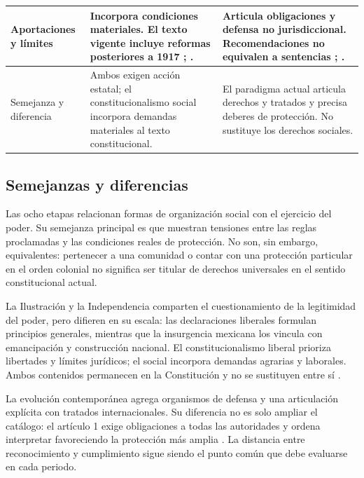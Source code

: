 \documentclass[12pt,spanish,letterpaper,oneside]{article}
\newlength{\categorywidth}
\newlength{\periodwidth}
\newlength{\lastperiodwidth}
\begin{document}
\begin{landscape}
\begin{longtable}{|>{\raggedright\arraybackslash}p{\categorywidth}|>{\raggedright\arraybackslash}p{\periodwidth}|>{\raggedright\arraybackslash}p{\lastperiodwidth}|}
Aportaciones y l\'imites & Incorpora condiciones materiales. El texto vigente incluye reformas posteriores a 1917 \citep[p.~2]{arteaga}; \citep[arts.~3, 27 y 123]{cpeum2026}. & Articula obligaciones y defensa no jurisdiccional. Recomendaciones no equivalen a sentencias \citep[pp.~47--48]{alvarez2009}; \citep[arts.~1 y 102 B]{cpeum2026}. \\\hline
Semejanza y diferencia & Ambos exigen acci\'on estatal; el constitucionalismo social incorpora demandas materiales al texto constitucional. & El paradigma actual articula derechos y tratados y precisa deberes de protecci\'on. No sustituye los derechos sociales. \\\hline
\end{longtable}
\end{landscape}
\clearpage
\pagestyle{plain}
\onehalfspacing

\subsection{Semejanzas y diferencias}
Las ocho etapas relacionan formas de organizaci\'on social con el ejercicio
del poder. Su semejanza principal es que muestran tensiones entre las
reglas proclamadas y las condiciones reales de protecci\'on. No son,
sin embargo, equivalentes: pertenecer a una comunidad o contar con una
protecci\'on particular en el orden colonial no significa ser titular de
derechos universales en el sentido constitucional actual.

La Ilustraci\'on y la Independencia comparten el cuestionamiento de la
legitimidad del poder, pero difieren en su escala: las declaraciones liberales
formulan principios generales, mientras que la insurgencia mexicana los
vincula con emancipaci\'on y construcci\'on nacional. El constitucionalismo
liberal prioriza libertades y l\'imites jur\'idicos; el social incorpora demandas
agrarias y laborales. Ambos contenidos permanecen en la Constituci\'on y
no se sustituyen entre s\'i \citep[pp.~1--2]{arteaga}.

La evoluci\'on contempor\'anea agrega organismos de defensa y una
articulaci\'on expl\'icita con tratados internacionales. Su diferencia no es
solo ampliar el cat\'alogo: el art\'iculo 1 exige obligaciones a todas las
autoridades y ordena interpretar favoreciendo la protecci\'on m\'as amplia
\citep[art.~1]{cpeum2026}. La distancia entre reconocimiento y cumplimiento
sigue siendo el punto com\'un que debe evaluarse en cada periodo.

\clearpage
\end{document}
